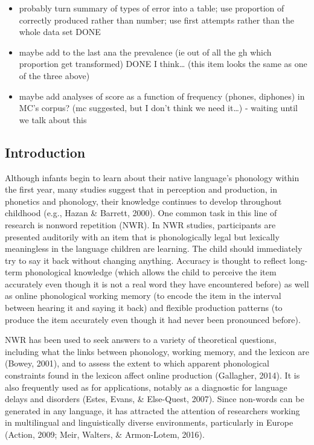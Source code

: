 \documentclass[english,,man,floatsintext]{apa6}
\providecommand{\tightlist}{%
  \setlength{\itemsep}{0pt}\setlength{\parskip}{0pt}}
\begin{document}
\begin{itemize}
\tightlist
\item
  probably turn summary of types of error into a table; use proportion
  of correctly produced rather than number; use first attempts rather
  than the whole data set DONE
\item
  maybe add to the last ana the prevalence (ie out of all the gh which
  proportion get transformed) DONE I think\ldots{} (this item looks the
  same as one of the three above)
\item
  maybe add analyses of score as a function of frequency (phones,
  diphones) in MC's corpus? (mc suggested, but I don't think we need
  it\ldots{}) - waiting until we talk about this
\end{itemize}

\subsection{Introduction}\label{introduction}

Although infants begin to learn about their native language's phonology
within the first year, many studies suggest that in perception and
production, in phonetics and phonology, their knowledge continues to
develop throughout childhood (e.g., Hazan \& Barrett, 2000). One common
task in this line of research is nonword repetition (NWR). In NWR
studies, participants are presented auditorily with an item that is
phonologically legal but lexically meaningless in the language children
are learning. The child should immediately try to say it back without
changing anything. Accuracy is thought to reflect long-term phonological
knowledge (which allows the child to perceive the item accurately even
though it is not a real word they have encountered before) as well as
online phonological working memory (to encode the item in the interval
between hearing it and saying it back) and flexible production patterns
(to produce the item accurately even though it had never been pronounced
before).

NWR has been used to seek answers to a variety of theoretical questions,
including what the links between phonology, working memory, and the
lexicon are (Bowey, 2001), and to assess the extent to which apparent
phonological constraints found in the lexicon affect online production
(Gallagher, 2014). It is also frequently used as for applications,
notably as a diagnostic for language delays and disorders (Estes, Evans,
\& Else-Quest, 2007). Since non-words can be generated in any language,
it has attracted the attention of researchers working in multilingual
and linguistically diverse environments, particularly in Europe (Action,
2009; Meir, Walters, \& Armon-Lotem, 2016).
\end{document}
